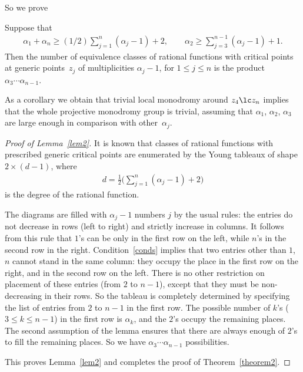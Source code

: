 So we prove

\begin{lem}\label{lem2}
Suppose that
\begin{gather}\label{conds}
\alpha_1+\alpha_n\geq (1/2)\sum_{j=1}^n(\alpha_j-1)+2,\qquad \alpha_2\geq\sum_{j=3}^{n-1}(\alpha_j-1)+1.
\end{gather}
Then the number of equivalence classes of rational functions with critical points at generic points~$z_j$ of multiplicities $\alpha_j-1$, for $1\leq j\leq n$ is the product $\alpha_3\cdots\alpha_{n-1}$.
\end{lem}

As a corollary we obtain that trivial local monodromy around $z_4\lc z_n$ implies that the whole projective monodromy group is trivial, assuming that $\alpha_1$, $\alpha_2$, $\alpha_3$ are large enough in comparison with
other~$\alpha_j$.

\begin{proof}[Proof of Lemma~\ref{lem2}]It is known \cite{EGSV} that classes of rational functions with prescribed generic critical points are enumerated by the Young tableaux of shape $2\times (d-1)$, where
\begin{gather*}
d=\frac12 \biggl(\sum_{j=1}^n(\alpha_j-1)+2\biggr)
\end{gather*}
is the degree of the rational function.

The diagrams are filled with $\alpha_j-1$ numbers $j$ by the usual rules: the entries do not decrease in rows (left to right) and strictly increase in columns. It follows from this rule that $1$'s can be only in the first row on the left, while $n$'s in the second row in the right. Condition~\eqref{conds} implies that two entries other than $1$, $n$ cannot stand in the same column: they occupy the place in the first row on the right, and in the second row on the left. There is no other restriction on placement of these entries (from $2$ to $n-1$), except that they must be non-decreasing in their rows. So the tableau is completely determined by specifying the list of entries from $2$ to $n-1$ in the first row. The possible number of $k$'s ($3\leq k\leq n-1$) in the first row is $\alpha_k$, and the $2$'s occupy the remaining places. The second assumption of the lemma ensures that there are always enough of $2$'s to fill the remaining places. So we have $\alpha_3\cdots\alpha_{n-1}$ possibilities.

This proves Lemma~\ref{lem2} and completes the proof of Theorem~\ref{theorem2}.
\end{proof}

